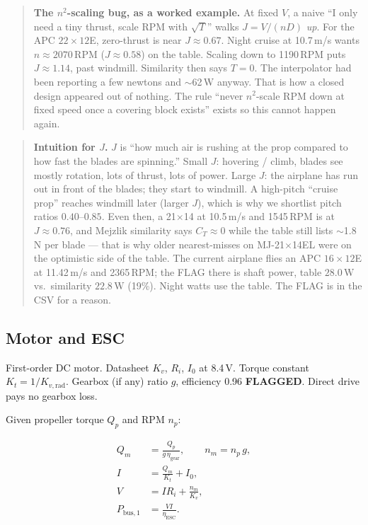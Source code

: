 \documentclass[11pt,letterpaper]{article}
\newcommand{\flag}{\textcolor{red!60!black}{\textbf{FLAGGED}}}
\newenvironment{intuition}{\begin{quote}\small}{\end{quote}}
\newenvironment{warningbox}{\begin{quote}\small}{\end{quote}}
\begin{document}
\begin{warningbox}
\textbf{The $n^2$-scaling bug, as a worked example.}
At fixed $V$, a naive ``I only need a tiny thrust, scale RPM with $\sqrt{T}$'' walks $J = V/(nD)$ \emph{up}. For the APC $22\times12$E, zero-thrust is near $J \approx 0.67$. Night cruise at 10.7\,m/s wants $n \approx 2070$\,RPM ($J \approx 0.58$) on the table. Scaling down to 1190\,RPM puts $J \approx 1.14$, past windmill. Similarity then says $T=0$. The interpolator had been reporting a few newtons and $\sim$62\,W anyway. That is how a closed design appeared out of nothing. The rule ``never $n^2$-scale RPM down at fixed speed once a covering block exists'' exists so this cannot happen again.
\end{warningbox}

\begin{intuition}
\textbf{Intuition for $J$.} $J$ is ``how much air is rushing at the prop compared to how fast the blades are spinning.'' Small $J$: hovering / climb, blades see mostly rotation, lots of thrust, lots of power. Large $J$: the airplane has run out in front of the blades; they start to windmill. A high-pitch ``cruise prop'' reaches windmill later (larger $J$), which is why we shortlist pitch ratios $0.40$--$0.85$. Even then, a 21$\times$14 at 10.5\,m/s and 1545\,RPM is at $J \approx 0.76$, and Mejzlik similarity says $C_T \approx 0$ while the table still lists $\sim$1.8\,N per blade --- that is why older nearest-misses on MJ-21$\times$14EL were on the optimistic side of the table. The current airplane flies an APC $16\times12$E at 11.42\,m/s and 2365\,RPM; the FLAG there is shaft power, table $28.0\,\mathrm{W}$ vs.\ similarity $22.8\,\mathrm{W}$ (19\%). Night watts use the table. The FLAG is in the CSV for a reason.
\end{intuition}

\subsection{Motor and ESC}

First-order DC motor. Datasheet $K_v$, $R_i$, $I_0$ at 8.4\,V. Torque constant $K_t = 1 / K_{v,\mathrm{rad}}$. Gearbox (if any) ratio $g$, efficiency 0.96 \flag{}. Direct drive pays no gearbox loss.

Given propeller torque $Q_p$ and RPM $n_p$:

\begin{align}
  Q_m &= \frac{Q_p}{g\,\eta_\mathrm{gear}}, \qquad
  n_m = n_p\, g, \\
  I &= \frac{Q_m}{K_t} + I_0, \\
  V &= I R_i + \frac{n_m}{K_v}, \\
  P_\mathrm{bus,1} &= \frac{V I}{\eta_\mathrm{ESC}}.
\end{align}
\end{document}
